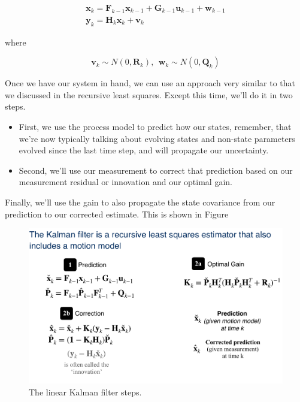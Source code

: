 \begin{eqnarray}
\mathbf{x}_k = \mathbf{F}_{k-1}\mathbf{x}_{k-1} + \mathbf{G}_{k-1}\mathbf{u}_{k-1} + \mathbf{w}_{k-1} \\
\mathbf{y}_k = \mathbf{H}_k \mathbf{x}_k + \mathbf{v}_k
\end{eqnarray}

where

\begin{equation}
\mathbf{v}_k \sim N(0, \mathbf{R}_k), ~~ \mathbf{w}_k \sim N(0, \mathbf{Q}_k) 
\end{equation}

Once we have our system in hand, we can use an approach
very similar to that we discussed in the recursive
least squares. Except this time, we'll
do it in two steps. 

\begin{itemize}
\item First, we use the process model to predict how our states, remember, that we're now typically talking
about evolving states and non-state parameters evolved since the last time step, and will propagate our uncertainty. 
\item Second, we'll use our measurement to correct that prediction based on our measurement residual
or innovation and our optimal gain. 
\end{itemize}

Finally, we'll use the gain to also propagate the state covariance from our prediction
to our corrected estimate. This is shown in Figure

\begin{figure}[!htb]
\begin{center}
\includegraphics[scale=0.280]{img/kalman_filter/kalman_2.jpeg}
\end{center}
\caption{The linear Kalman filter steps.}
\label{kalman_2}
\end{figure}

